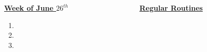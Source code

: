 \documentclass[serif, mathserif, final]{beamer}
\begin{document}
\begin{frame}{}
\begin{columns}
\begin{column}{0.5\linewidth}
\begin{block}{\small \underline{\textbf{Week of June $26^{th}$}}}
\begin{enumerate}
\tiny \item \tiny 
\item \tiny 
\item \tiny 
\end{enumerate}
\end{block}

\end{column}


\begin{column}{0.28\linewidth}
\begin{block}{\small \textbf{\underline{Regular Routines}} }

\end{block} 
\end{column}%
\end{columns} 
\end{frame}
\end{document}
